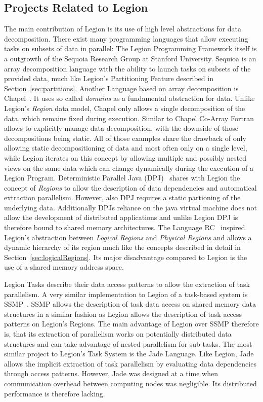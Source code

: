 \documentclass{article}      %
\begin{document}
\subsection{Projects Related to Legion}
The main contribution of Legion is its use of high level abstractions for data decomposition.
There exist many programming languages that allow executing tasks on subsets of data in parallel:
The Legion Programming Framework itself is a outgrowth of the Sequoia\cite{sequoia} Research Group at Stanford University.
Sequioa is an array decomposition language with the ability to launch tasks on subsets of the provided data,
much like Legion's Partitioning Feature described in Section~\ref{sec:partitions}.
Another Language based on array decomposition is Chapel~\cite{chapel}. It uses so called \emph{domains} as a fundamental abstraction for data.
Unlike Legion's \emph{Region} data model, Chapel only allows a single decomposition of the data, which remains fixed during execution.
Similar to Chapel Co-Array Fortran~\cite{coArrayFortran} allows to explicitly manage data decomposition, with the downside of those decompositions being static.
All of those examples share  the drawback of only allowing static decompositioning of data and most often only on a single level, while Legion iterates on this concept by allowing multiple and possibly nested views on the same data which can change dynamically during the execution of a Legion Program.
Deterministic Parallel Java (DPJ)~\cite{DPJ} shares with Legion the concept of \emph{Regions} to allow the description of data dependencies and automatical extraction parallelism.
However, also DPJ requires a static partioning of the underlying data. Additionally DPJs reliance on the java virtual machine does not allow the development of distributed applications and unlike Legion DPJ is therefore bound to shared memory architectures.
The Language RC~\cite{RC} inspired Legion's abstraction between \emph{Logical Regions} and \emph{Physical Regions} and allows a dynamic hierarchy of its region much like the concepts described in detail in Section~\ref{sec:logicalRegions}. Its major disadvantage compared to Legion is the use of a shared memory address space.

Legion Tasks describe their data access patterns to allow the extraction of task parallelism. A very similar implementation to Legion of a task-based system is SSMP~\cite{SSMP}.
SSMP allows the description of task data access on shared memory data structures in a similar fashion as Legion allows the description of task access patterns on Legion's Regions.
The main advantage of Legion over SSMP therefore is, that its extraction of parallelism works on potentially distributed data structures and can take advantage of nested parallelism for sub-tasks.
The most similar project to Legion's Task System is the Jade Language\cite{Jade}. Like Legion, Jade allows the implicit extraction of task parallelism by evaluating data dependencies through access patterns. However, Jade was designed at a time when communication overhead between computing nodes was negligible. Its distributed performance is therefore lacking.
\end{document}
